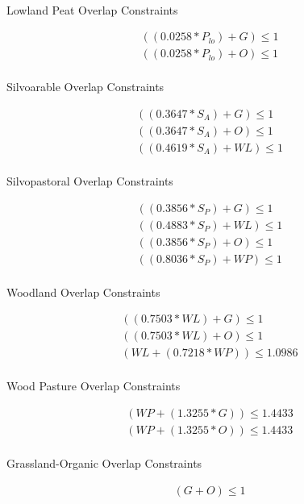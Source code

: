 \documentclass{article}
\begin{document}
 
\begin{center} 
\begin{align*}
\end{align*}

Lowland Peat Overlap Constraints

\begin{align*}
((0.0258 * P_{lo}) + G) \leq 1\\
((0.0258 * P_{lo}) + O) \leq 1\\
\end{align*}

Silvoarable Overlap Constraints

\begin{align*}
((0.3647 * S_{A}) + G) \leq 1\\
((0.3647 * S_{A}) + O) \leq 1\\
((0.4619 * S_{A}) + WL) \leq 1\\
\end{align*}

Silvopastoral Overlap Constraints

\begin{align*}
((0.3856 * S_{P}) + G) \leq 1\\
((0.4883 * S_{P}) + WL) \leq 1\\
((0.3856 * S_{P}) + O) \leq 1\\
((0.8036 * S_{P}) + WP) \leq 1\\
\end{align*}

Woodland Overlap Constraints

\begin{align*}
((0.7503 * WL) + G) \leq 1\\
((0.7503 * WL) + O) \leq 1\\
(WL + (0.7218 * WP)) \leq 1.0986\\
\end{align*}

Wood Pasture Overlap Constraints

\begin{align*}
(WP + (1.3255 * G)) \leq 1.4433\\
(WP + (1.3255 * O)) \leq 1.4433\\
\end{align*}

Grassland-Organic Overlap Constraints

\begin{align*}
(G + O) \leq 1
\end{align*} 
\end{center} 
\end{document}
